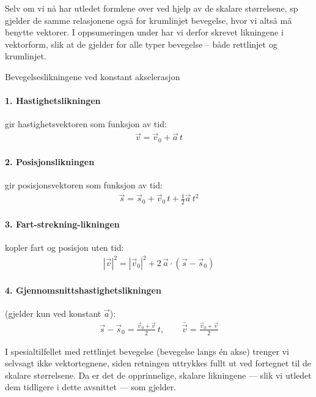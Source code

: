 Selv om vi nå har utledet formlene over ved hjelp av de skalare størrelsene, sp gjelder de samme relasjonene også for krumlinjet bevegelse, hvor vi altså må benytte vektorer. I oppsumeringen under har vi derfor skrevet likningene i vektorform, slik at de gjelder for alle typer bevegelse – både rettlinjet og krumlinjet.
\begin{myoppsum*}{Bevegelseslikningene ved konstant akselerasjon}
\paragraph{1. Hastighetslikningen} gir hastighetsvektoren som funksjon av tid:
    \begin{align}
        \vec{v} = \vec{v}_0 + \vec{a}\,t
    \end{align}

\paragraph{2. Posisjonslikningen} gir posisjonsvektoren som funksjon av tid:
    \begin{align}
        \vec{s} = \vec{s}_0 + \vec{v}_0\,t + \tfrac{1}{2}\vec{a}\,t^2
    \end{align}

\paragraph{3. Fart-strekning-likningen} kopler fart og posisjon uten tid:
    \begin{align}
       |\vec{v}|^2 = |\vec{v}_0|^2 + 2\,\vec{a} \cdot (\vec{s} - \vec{s}_0)
    \end{align}

\paragraph{4. Gjennomsnittshastighetslikningen} (gjelder kun ved konstant $\vec{a}$):
    \begin{align}
        \vec{s} - \vec{s}_0 = \frac{\vec{v}_0 + \vec{v}}{2}\,t, \qquad \bar{\vec{v}} = \frac{\vec{v}_0 + \vec{v}}{2}
    \end{align}
\end{myoppsum*}

I spesialtilfellet med rettlinjet bevegelse (bevegelse langs én akse) trenger vi selvsagt ikke vektortegnene, siden retningen uttrykkes fullt ut ved fortegnet til de skalare størrelsene. Da er det de opprinnelige, skalare likningene --- slik vi utledet dem tidligere i dette avsnittet --- som gjelder.

